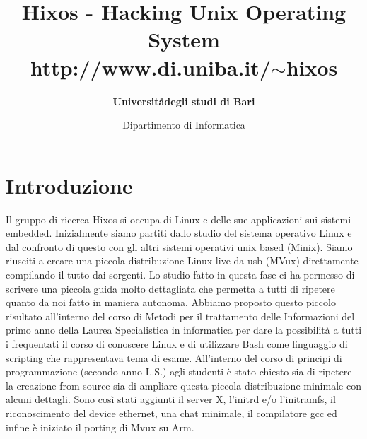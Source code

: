 \documentclass[a4paper,12pt]{article}
\title{\textbf{Hixos} - Hacking Unix Operating System\\http://www.di.uniba.it/$\sim$hixos}
\author{\textbf{Universit\aa degli studi di Bari}}
\date{Dipartimento di Informatica}
\renewcommand{\aa }{\`{a} }
\newcommand{\ea }{\`{e} }
\newcommand{\ia }{\`{i} }
\begin{document}
\maketitle



\section*{Introduzione}
Il gruppo di ricerca Hixos si occupa di Linux e delle sue applicazioni sui sistemi embedded.
Inizialmente siamo partiti dallo studio del sistema operativo Linux e dal confronto di questo con gli altri sistemi operativi unix based (Minix). Siamo riusciti a creare una piccola distribuzione Linux live da usb (MVux) direttamente compilando il tutto dai sorgenti. Lo studio fatto in questa fase ci ha permesso di scrivere una piccola guida molto dettagliata che permetta a tutti di ripetere quanto da noi fatto in maniera autonoma.
Abbiamo proposto questo piccolo risultato all'interno del corso di Metodi per il trattamento delle Informazioni del primo anno della Laurea Specialistica in informatica per dare la possibilit\aa a tutti i frequentati il corso di conoscere Linux e di utilizzare Bash come linguaggio di scripting che rappresentava tema di esame.
All'interno del corso di principi di programmazione (secondo anno L.S.) agli studenti \ea stato chiesto sia di ripetere la creazione from source sia di ampliare questa piccola distribuzione minimale con alcuni dettagli. Sono cos\ia stati aggiunti il server X, l'initrd e\slash o l'initramfs, il riconoscimento del device ethernet, una chat minimale, il compilatore gcc ed infine \ea iniziato il porting di Mvux su Arm.
\end{document}
